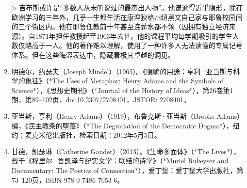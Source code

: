 \begin{enumerate}
  > 吉布斯或许是“多数人从未听说过的最杰出人物”。他谦逊得近乎隐形，除在欧洲学习的三年外，几乎一生都生活在康涅狄格州纽黑文自己家与耶鲁校园间的三个街区内。他在耶鲁任教前十年甚至连薪水都不领（因拥有独立经济来源）。自1871年担任教授起至1903年去世，他的课程平均每学期吸引的学生人数仅略高于一人。他的著作难以理解，使用了一种许多人无法读懂的专属记号体系。但在这些晦涩表达中，隐藏着极其卓越的洞见。
\item 明德尔，约瑟夫（Joseph Mindel）（1965）。《隐喻的用途：亨利·亚当斯与科学的象征》（*The Uses of Metaphor: Henry Adams and the Symbols of Science*），《思想史期刊》（*Journal of the History of Ideas*），第26卷第1期，第89–102页，doi:10.2307/2708401，JSTOR: 2708401。
\item 亚当斯，亨利（Henry Adams）（1919），布鲁克斯·亚当斯（Brooks Adams）编，《民主教条的堕落》（*The Degradation of the Democratic Dogma*），纽约：麦克米伦出版社，检索日期：2012年5月5日。
\item 甘德，凯瑟琳（Catherine Gander）（2013）。《生命多面体》（*The Lives*），载于《穆里尔·鲁凯泽与纪实文学：联结的诗学》（*Muriel Rukeyser and Documentary: The Poetics of Connection*），爱丁堡：爱丁堡大学出版社，第73–120页，ISBN 978-0-7486-7053-6。

\end{enumerate}